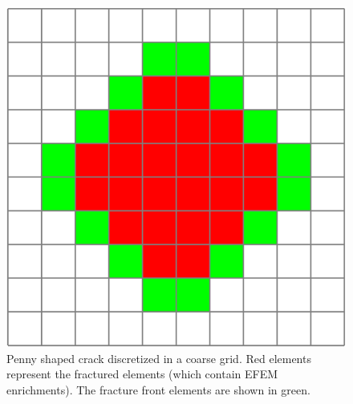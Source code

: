 \begin{figure}[h]
    \centering
    \includegraphics[width=0.4\linewidth]{Chapter4/figures/front_penny.png}
    \caption{Penny shaped crack discretized in a coarse grid. Red elements represent the fractured elements (which contain EFEM enrichments). The fracture front elements are shown in green. }
    \label{fig:crack_front}
\end{figure}

